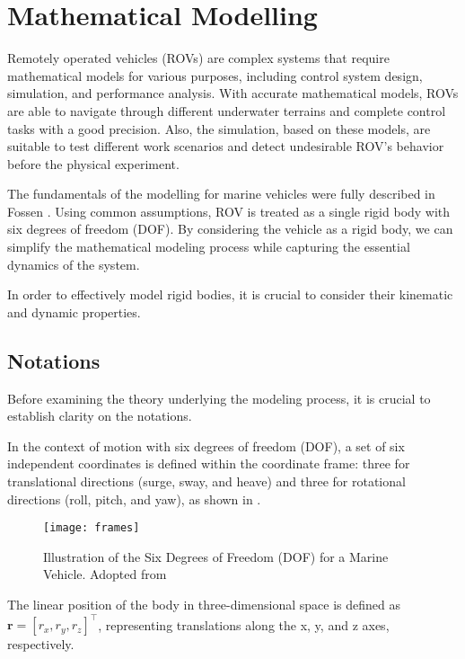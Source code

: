 \chapter{Mathematical Modelling}
\label{chap:mat}


    Remotely operated vehicles (ROVs) are complex systems that require mathematical models for various purposes, 
    including control system design, simulation, and performance analysis. With accurate mathematical models, 
    ROVs are able to navigate through different underwater terrains and complete control tasks with a good 
    precision. Also, the simulation, based on these models, are suitable to test different work scenarios and 
    detect undesirable ROV's behavior before the physical experiment.   
    
    The fundamentals of the modelling for marine vehicles were fully described in Fossen \cite{fossen:guidance}.
    Using common assumptions, ROV is treated as a single rigid body with six degrees of freedom (DOF).
    By considering the vehicle as a rigid body, we can simplify the mathematical modeling process while capturing the essential dynamics 
    of the system.

    In order to effectively model rigid bodies, it is crucial to consider their kinematic and dynamic properties.

    \section{Notations}
    
    Before examining the theory underlying the modeling process, 
    it is crucial to establish clarity on the notations. 

    In the context of motion with six degrees of freedom (DOF), 
    a set of six independent coordinates is defined within the 
    coordinate frame: three for translational directions 
    (surge, sway, and heave) and three for rotational directions 
    (roll, pitch, and yaw), as shown in .

    \begin{figure}[H]
        \centering\texttt{[image: frames]}
        \caption{Illustration of the Six Degrees of Freedom (DOF) for a Marine Vehicle. Adopted from \cite{6dof}}
        \label{image:6dof}
    \end{figure}

    The linear position of the body in three-dimensional space is defined as 
    $ \mathbf{r} = [r_x, r_y, r_z]^\top $, representing translations along 
    the x, y, and z axes, respectively. 
    

